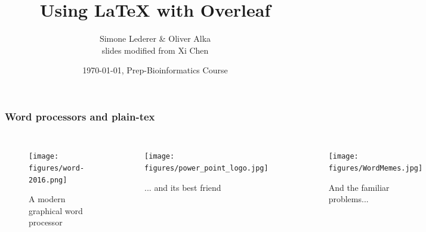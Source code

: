 \documentclass{beamer}
\title[Basic \LaTeX{}]{Using \LaTeX{} with Overleaf}
\author{Simone Lederer \& Oliver Alka \\ slides modified from Xi Chen}
\institute[]
{Algorithms in Bioinformatics, ZBIT\\
  University of T\"{u}bingen \\ 
}
\date[Vorkurs WiSe 2020/21]{\monthyeardate\today, Prep-Bioinformatics Course}
\begin{document}

\begin{frame} %
\frametitle{Word processors and plain-tex}
\begin{columns}
    \begin{figure}
        \caption{A modern graphical word processor}
        \texttt{[image: figures/word-2016.png]}
    \end{figure}
    \begin{figure}
        \caption{... and its best friend}
        \texttt{[image: figures/power\_point\_logo.jpg]}
    \end{figure}
    \begin{figure}
        \caption{And the familiar problems...}
        \texttt{[image: figures/WordMemes.jpg]}
    \end{figure}
\end{columns}
\end{frame}
\end{document}
